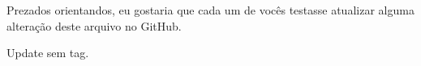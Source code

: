 \documentclass{article}
\begin{document}
Prezados orientandos,
eu gostaria que cada um de vocês testasse atualizar alguma alteração deste arquivo no GitHub.

Update sem tag.
\end{document}
